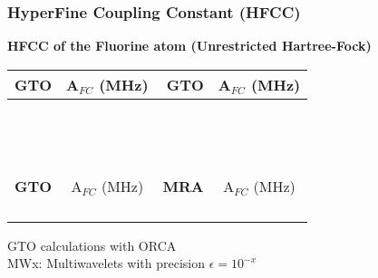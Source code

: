 \begin{frame}
\frametitle{HyperFine Coupling Constant (HFCC)}
\centering
\scriptsize
\textbf{HFCC of the Fluorine atom (Unrestricted Hartree-Fock)}
\begin{table}
\begin{tabular}{rrrr}
\hline
\hline
\multicolumn{1}{r}{\textbf{GTO}}&
\multicolumn{1}{c}{A$_{FC}$ (MHz)}&
\multicolumn{1}{r}{\textbf{GTO}}&
\multicolumn{1}{c}{A$_{FC}$ (MHz)}\\
\hline                        
               &                &                &                \\
               &                &                &                \\
               &                &                &                \\
               &                &                &                \\
\hline
\hline
\hspace{15mm}\ & \hspace{15mm}\ & \hspace{25mm}\ & \hspace{15mm}\ \\
\hspace{15mm}\ & \hspace{15mm}\ & \hspace{25mm}\ & \hspace{15mm}\ \\
\hline
\hline
\multicolumn{1}{r}{\textbf{GTO}}&
\multicolumn{1}{c}{A$_{FC}$ (MHz)}&
\multicolumn{1}{r}{\textbf{MRA}}&
\multicolumn{1}{c}{A$_{FC}$ (MHz)}\\
\hline
                &                &               &                \\
                &                &               &                \\
                &                &               &                \\
                &                &               &                \\
\hline
\hline
\end{tabular}
\end{table}
\tiny
GTO calculations with ORCA\\
MWx: Multiwavelets with precision $\epsilon=10^{-x}$
\end{frame}

